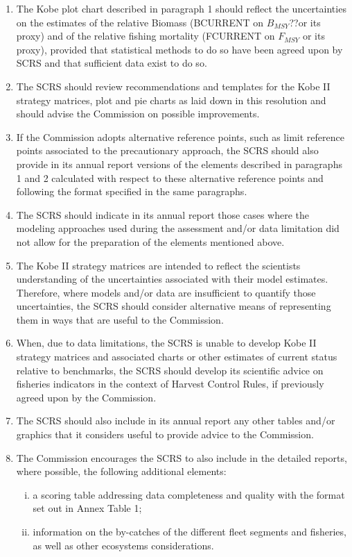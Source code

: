 \documentclass[a4paper, 11pt, oldtoc]{artikel1}
\begin{document}
\begin{enumerate}
    \item  The Kobe plot chart described in paragraph 1 should reflect the uncertainties on the estimates of the relative Biomass (BCURRENT on $B_{MSY}$??or its proxy) and of the relative fishing mortality (FCURRENT on $F_{MSY}$ or its proxy), provided that statistical methods to do so have been agreed upon by SCRS and that sufficient data exist to do so.
    \item  The SCRS should review recommendations and templates for the Kobe II strategy matrices, plot and pie charts as laid down in this resolution and should advise the Commission on possible improvements.
    \item  If the Commission adopts alternative reference points, such as limit reference points associated to the precautionary approach, the SCRS should also provide in its annual report versions of the elements described in paragraphs 1 and 2 calculated with respect to these alternative reference points and following the format specified in the same paragraphs.
    \item   The SCRS should indicate in its annual report those cases where the modeling approaches used during the assessment and/or data limitation did not allow for the preparation of the elements mentioned above. 
    \item   The Kobe II strategy matrices are intended to reflect the scientists understanding of the uncertainties associated with their model estimates. Therefore, where models and/or data are insufficient to quantify those uncertainties, the SCRS should consider alternative means of representing them in ways that are useful to the Commission.
    \item   When, due to data limitations, the SCRS is unable to develop Kobe II strategy matrices and associated charts or other estimates of current status relative to benchmarks, the SCRS should develop its scientific advice on fisheries indicators in the context of Harvest Control Rules, if previously agreed upon by the Commission.
    \item   The SCRS should also include in its annual report any other tables and/or graphics that it considers useful to provide advice to the Commission.
    \item   The Commission encourages the SCRS to also include in the detailed reports, where possible, the following additional elements:

    \begin{enumerate}[i)]
      \item a scoring table addressing data completeness and quality with the format set out in Annex Table 1;
      \item information on the by-catches of the different fleet segments and fisheries, as well as other ecosystems considerations.
      \end{enumerate}
  \end{enumerate}
\end{document}
